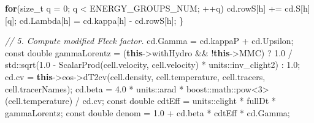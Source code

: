 \documentclass[
]{article}
\newenvironment{Shaded}{}{}
\newcommand{\AttributeTok}[1]{\textcolor[rgb]{0.49,0.56,0.16}{#1}}
\newcommand{\BuiltInTok}[1]{\textcolor[rgb]{0.00,0.50,0.00}{#1}}
\newcommand{\CommentTok}[1]{\textcolor[rgb]{0.38,0.63,0.69}{\textit{#1}}}
\newcommand{\ControlFlowTok}[1]{\textcolor[rgb]{0.00,0.44,0.13}{\textbf{#1}}}
\newcommand{\DataTypeTok}[1]{\textcolor[rgb]{0.56,0.13,0.00}{#1}}
\newcommand{\DecValTok}[1]{\textcolor[rgb]{0.25,0.63,0.44}{#1}}
\newcommand{\ExtensionTok}[1]{#1}
\newcommand{\FloatTok}[1]{\textcolor[rgb]{0.25,0.63,0.44}{#1}}
\newcommand{\KeywordTok}[1]{\textcolor[rgb]{0.00,0.44,0.13}{\textbf{#1}}}
\newcommand{\NormalTok}[1]{#1}
\newcommand{\OperatorTok}[1]{\textcolor[rgb]{0.40,0.40,0.40}{#1}}
\begin{document}
\begin{Shaded}
\begin{Highlighting}[]
            \ControlFlowTok{for}\OperatorTok{(}\DataTypeTok{size\_t}\NormalTok{ q }\OperatorTok{=} \DecValTok{0}\OperatorTok{;}\NormalTok{ q }\OperatorTok{\textless{}}\NormalTok{ ENERGY\_GROUPS\_NUM}\OperatorTok{;} \OperatorTok{++}\NormalTok{q}\OperatorTok{)}
\NormalTok{                cd}\OperatorTok{.}\NormalTok{rowS}\OperatorTok{[}\NormalTok{h}\OperatorTok{]} \OperatorTok{+=}\NormalTok{ cd}\OperatorTok{.}\NormalTok{S}\OperatorTok{[}\NormalTok{h}\OperatorTok{][}\NormalTok{q}\OperatorTok{];}
\NormalTok{            cd}\OperatorTok{.}\NormalTok{Lambda}\OperatorTok{[}\NormalTok{h}\OperatorTok{]} \OperatorTok{=}\NormalTok{ cd}\OperatorTok{.}\NormalTok{kappa}\OperatorTok{[}\NormalTok{h}\OperatorTok{]} \OperatorTok{{-}}\NormalTok{ cd}\OperatorTok{.}\NormalTok{rowS}\OperatorTok{[}\NormalTok{h}\OperatorTok{];}
        \OperatorTok{\}}

        \CommentTok{// 5. Compute modified Fleck factor.}
\NormalTok{        cd}\OperatorTok{.}\NormalTok{Gamma }\OperatorTok{=}\NormalTok{ cd}\OperatorTok{.}\NormalTok{kappaP }\OperatorTok{+}\NormalTok{ cd}\OperatorTok{.}\NormalTok{Upsilon}\OperatorTok{;}
        \AttributeTok{const} \DataTypeTok{double}\NormalTok{ gammaLorentz }\OperatorTok{=} \OperatorTok{(}\KeywordTok{this}\OperatorTok{{-}\textgreater{}}\NormalTok{withHydro }\OperatorTok{\&\&} \OperatorTok{!}\KeywordTok{this}\OperatorTok{{-}\textgreater{}}\NormalTok{MMC}\OperatorTok{)}
            \OperatorTok{?} \FloatTok{1.0} \OperatorTok{/} \BuiltInTok{std::}\NormalTok{sqrt}\OperatorTok{(}\FloatTok{1.0} \OperatorTok{{-}}\NormalTok{ ScalarProd}\OperatorTok{(}\NormalTok{cell}\OperatorTok{.}\NormalTok{velocity}\OperatorTok{,}\NormalTok{ cell}\OperatorTok{.}\NormalTok{velocity}\OperatorTok{)} \OperatorTok{*}\NormalTok{ units}\OperatorTok{::}\NormalTok{inv\_clight2}\OperatorTok{)}
            \OperatorTok{:} \FloatTok{1.0}\OperatorTok{;}
\NormalTok{        cd}\OperatorTok{.}\NormalTok{cv }\OperatorTok{=} \KeywordTok{this}\OperatorTok{{-}\textgreater{}}\NormalTok{eos}\OperatorTok{{-}\textgreater{}}\NormalTok{dT2cv}\OperatorTok{(}\NormalTok{cell}\OperatorTok{.}\NormalTok{density}\OperatorTok{,}\NormalTok{ cell}\OperatorTok{.}\NormalTok{temperature}\OperatorTok{,}\NormalTok{ cell}\OperatorTok{.}\NormalTok{tracers}\OperatorTok{,}\NormalTok{ cell}\OperatorTok{.}\NormalTok{tracerNames}\OperatorTok{);}
\NormalTok{        cd}\OperatorTok{.}\NormalTok{beta }\OperatorTok{=} \FloatTok{4.0} \OperatorTok{*}\NormalTok{ units}\OperatorTok{::}\NormalTok{arad }\OperatorTok{*} \ExtensionTok{boost::}\NormalTok{math::pow}\OperatorTok{\textless{}}\DecValTok{3}\OperatorTok{\textgreater{}(}\NormalTok{cell}\OperatorTok{.}\NormalTok{temperature}\OperatorTok{)} \OperatorTok{/}\NormalTok{ cd}\OperatorTok{.}\NormalTok{cv}\OperatorTok{;}
        \AttributeTok{const} \DataTypeTok{double}\NormalTok{ cdtEff }\OperatorTok{=}\NormalTok{ units}\OperatorTok{::}\NormalTok{clight }\OperatorTok{*}\NormalTok{ fullDt }\OperatorTok{*}\NormalTok{ gammaLorentz}\OperatorTok{;}
        \AttributeTok{const} \DataTypeTok{double}\NormalTok{ denom }\OperatorTok{=} \FloatTok{1.0} \OperatorTok{+}\NormalTok{ cd}\OperatorTok{.}\NormalTok{beta }\OperatorTok{*}\NormalTok{ cdtEff }\OperatorTok{*}\NormalTok{ cd}\OperatorTok{.}\NormalTok{Gamma}\OperatorTok{;}


\end{Highlighting}
\end{Shaded}
\end{document}
